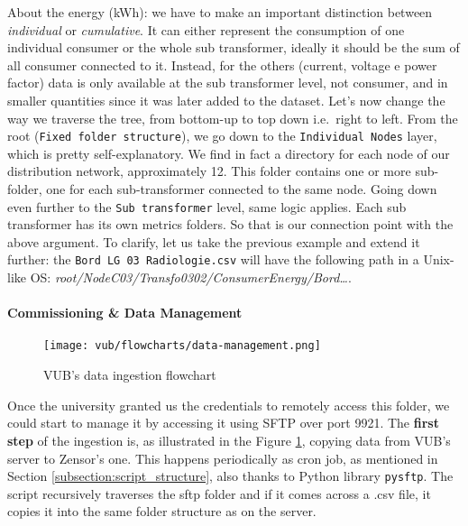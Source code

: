 About the energy (kWh): we have to make an important distinction between \textit{individual} or \textit{cumulative}. It can either represent the consumption of one individual consumer or the whole sub transformer, 
ideally it should be the sum of all consumer connected to it.
Instead, for the others (current, voltage e power factor) data is only available at the sub transformer level, not consumer, and in smaller quantities since it was later added to the dataset. 
Let's now change the way we traverse the tree, from bottom-up to top down i.e.\ right to left.
From the root (\texttt{Fixed folder structure}), we go down to the \texttt{Individual Nodes} layer, which is pretty self-explanatory. We find in fact a directory for each node of our distribution network, approximately 12. 
This folder contains one or more sub-folder, one for each sub-transformer connected to the same node. Going down even further to the \texttt{Sub transformer} level, same logic applies. Each sub transformer has its own metrics folders.
So that is our connection point with the above argument.
To clarify, let us take the previous example and extend it further: the \texttt{Bord LG 03 Radiologie.csv} will have the following path in a Unix-like OS: \textit{root/NodeC03/Transfo0302/ConsumerEnergy/Bord\dots}.

\paragraph{Commissioning \& Data Management}
\begin{figure}[ht]
    \texttt{[image: vub/flowcharts/data-management.png]}
    \caption{\ac{VUB}'s data ingestion flowchart}
    \label{fig:vub_ingestion}
\end{figure}
Once the university granted us the credentials to remotely access this folder, we could start to manage it by accessing it using \ac{SFTP} over port 9921. %
The \textbf{first step} of the ingestion is, as illustrated in the Figure \ref{fig:vub_ingestion}, copying data from \ac{VUB}'s server to Zensor's one. 
This happens periodically as cron job, as mentioned in Section \ref{subsection:script_structure}, also thanks to Python library \texttt{pysftp}. %
The script recursively traverses the sftp folder and if it comes across a .csv file, it copies it into the same folder structure as on the server.

